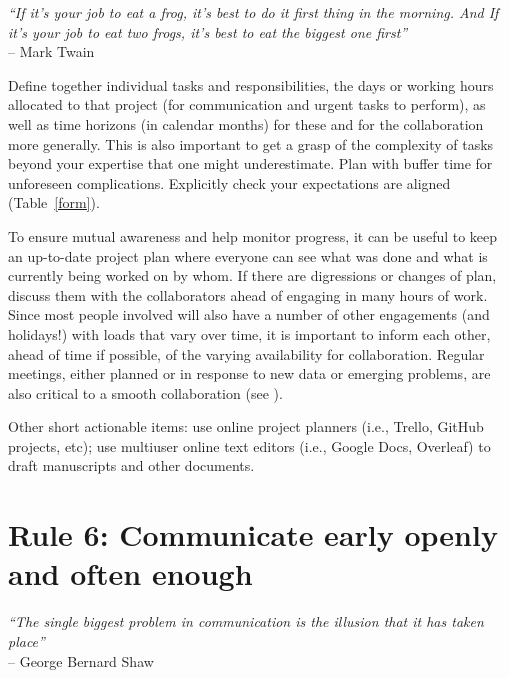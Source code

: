 \documentclass{article}
\begin{document}
\begin{flushright}
\rightskip=1cm\textit{``If it's your job to eat a frog, it's best to do it first thing in the morning. And If it's your job to eat two frogs, it's best to eat the biggest one first''} \\
\vspace{.2em}
\rightskip=0cm -- Mark Twain
\end{flushright}

Define together individual tasks and responsibilities, the days or working hours allocated to that project (for communication and urgent tasks to perform), as well as time horizons (in calendar months) for these and for the collaboration more generally. This is also important to get a grasp of the complexity of tasks beyond your expertise that one might underestimate. Plan with buffer time for unforeseen complications. Explicitly check your expectations are aligned (Table~\ref{form}).

To ensure mutual awareness and help monitor progress, it can be useful to keep an up-to-date project plan where everyone can see what was done and what is currently being worked on by whom. If there are digressions or changes of plan, discuss them with the collaborators ahead of engaging in many hours of work. Since most people involved will also have a number of other engagements (and holidays!) with loads that vary over time, it is important to inform each other, ahead of time if possible, of the varying availability for collaboration. Regular meetings, either planned or in response to new data or emerging problems, are also critical to a smooth collaboration (see ). 

Other short actionable items: use online project planners (i.e., Trello, GitHub projects, etc); use multiuser online text editors (i.e., Google Docs, Overleaf) to draft manuscripts and other documents.

\section*{Rule 6: Communicate early openly and often enough} %
\label{rule6_communication}

\begin{flushright}
\rightskip=1cm\textit{``The single biggest problem in communication is the illusion that it has taken place''} \\
\vspace{.2em}
\rightskip=0cm -- George Bernard Shaw
\end{flushright}
\end{document}
